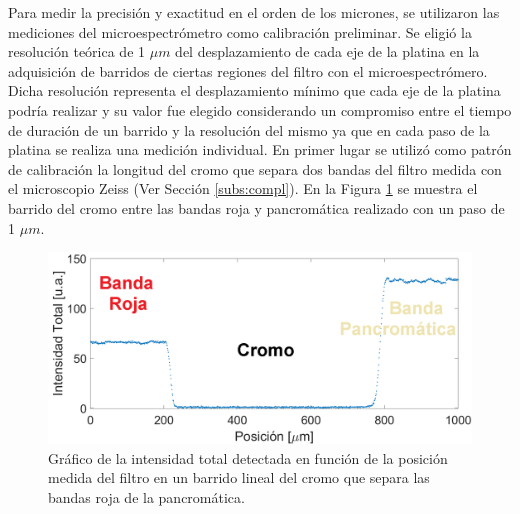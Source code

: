 Para medir la precisión y exactitud en el orden de los micrones, se utilizaron las mediciones del microespectrómetro como calibración preliminar. Se eligió la resolución teórica de 1 $\mu m$ del desplazamiento de cada eje de la platina en la adquisición de barridos de ciertas regiones del filtro con el microespectrómero. Dicha resolución representa el desplazamiento mínimo que cada eje de la platina podría realizar y su valor fue elegido considerando un compromiso entre el tiempo de duración de un barrido y la resolución del mismo ya que en cada paso de la platina se realiza una medición individual.
En primer lugar se utilizó como patrón de calibración la longitud del cromo que separa dos bandas del filtro medida con el microscopio Zeiss (Ver Sección \ref{subs:compl}). En la Figura \ref{fig:barrcromoo} se muestra el barrido del cromo entre las bandas roja y pancromática realizado con un paso de 1 $\mu m$.

\begin{figure}[H]
	\centering
	\includegraphics[width=1.0\columnwidth]{Figs/microespectrometro/barridocromocalib.png}
	\caption{Gráfico de la intensidad total detectada en función de la posición medida del filtro en un barrido lineal del cromo que separa las bandas roja de la pancromática.}
	\label{fig:barrcromoo}
\end{figure}

